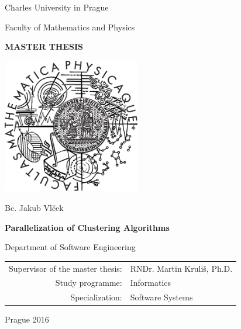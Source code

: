 \documentclass[12pt,a4paper]{report}
\begin{document}


\pagestyle{empty}
\begin{center}

\large

Charles University in Prague

\medskip

Faculty of Mathematics and Physics

\vfill

{\bf\Large MASTER THESIS}

\vfill

\centerline{\mbox{\includegraphics[width=60mm]{img/logo.eps}}}

\vfill
\vspace{5mm}

{\LARGE Bc. Jakub Vlček}

\vspace{15mm}

{\LARGE\bfseries Parallelization of Clustering Algorithms}

\vfill

Department of Software Engineering

\vfill

\begin{tabular}{rl}

Supervisor of the master thesis: & RNDr. Martin Kruliš, Ph.D. \\
\noalign{\vspace{2mm}}
Study programme: & Informatics \\
\noalign{\vspace{2mm}}
Specialization: & Software Systems \\
\end{tabular}

\vfill

Prague 2016

\end{center}
\end{document}

